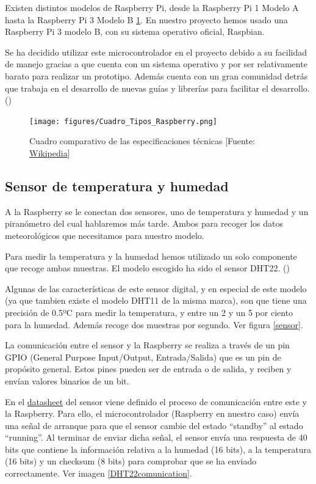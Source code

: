Existen distintos modelos de Raspberry Pi, desde la Raspberry Pi 1 Modelo A hasta la Raspberry Pi 3 Modelo B \ref{types}.
En nuestro proyecto hemos usado una Raspberry Pi 3 modelo B, con su sistema operativo oficial, Raspbian.

Se ha decidido utilizar este microcontrolador en el proyecto debido a su facilidad de manejo gracias a que cuenta con un sistema operativo y por ser relativamente barato para realizar un prototipo. Además cuenta con un gran comunidad detrás que trabaja en el desarrollo de nuevas guías y librerías para facilitar el desarrollo. (\cite{ARP:RaspberryPi:2017})

\begin{figure}[htb]
	\begin{center}
		\texttt{[image: figures/Cuadro\_Tipos\_Raspberry.png]}
		\caption{Cuadro comparativo de las especificaciones técnicas [Fuente: \href{www.wikipedia.org}{Wikipedia}]\label{types}}
	\end{center}
\end{figure}

\subsection{Sensor de temperatura y humedad}
\label{makereference3.2.2}

A la Raspberry se le conectan dos sensores, uno de temperatura y humedad y un piranómetro del cual hablaremos más tarde. Ambos para recoger los datos meteorológicos que necesitamos para nuestro modelo.

Para medir la temperatura y la humedad hemos utilizado un solo componente que recoge ambas muestras. El modelo escogido ha sido el sensor DHT22. (\cite{ARP:Adafruit:2017})

Algunas de las características de este sensor digital, y en especial de este modelo (ya que tambien existe el modelo DHT11 de la misma marca), son que tiene una precisión de 0.5ºC para medir la temperatura, y entre un 2 y un 5 por ciento para la humedad. Además recoge dos muestras por segundo. Ver figura \ref{sensor}.

La comunicación entre el sensor y la Raspberry se realiza a través de un pin GPIO (General Purpose Input/Output, Entrada/Salida) que es un pin de propósito general. Estos pines pueden ser de entrada o de salida, y reciben y envían valores binarios de un bit.

En el \href{https://cdn-shop.adafruit.com/datasheets/Digital+humidity+and+temperature+sensor+AM2302.pdf}{datasheet} del sensor viene definido el proceso de comunicación entre este y la Raspberry. Para ello, el microcontrolador (Raspberry en nuestro caso) envía una señal de arranque para que el sensor cambie del estado ``standby'' al estado ``running''. Al terminar de enviar dicha señal, el sensor envía una respuesta de 40 bits que contiene la información relativa a la humedad (16 bits), a la temperatura (16 bits) y un checksum (8 bits) para comprobar que se ha enviado correctamente. Ver imagen \ref{DHT22comunication}.

